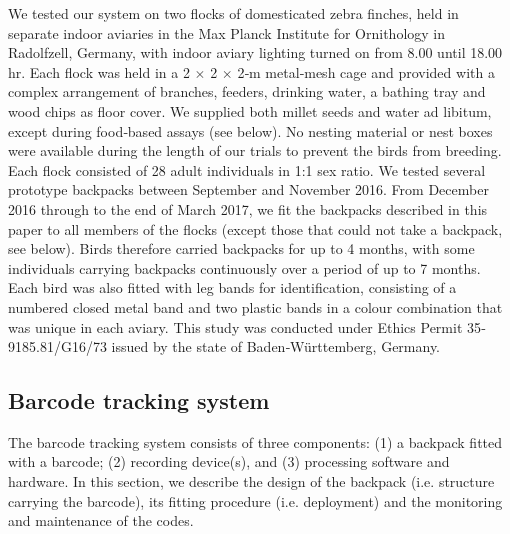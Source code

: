\documentclass[11pt,a4paper,oneside]{book}
\begin{document}
\begin{doublespace}
We tested our system on two flocks of domesticated zebra finches, held in separate indoor aviaries in the Max Planck Institute for Ornithology in Radolfzell, Germany, with indoor aviary lighting turned on from 8.00 until 18.00 hr. Each flock was held in a 2 $\times$ 2 $\times$ 2‐m metal‐mesh cage and provided with a complex arrangement of branches, feeders, drinking water, a bathing tray and wood chips as floor cover. We supplied both millet seeds and water ad libitum, except during food‐based assays (see below). No nesting material or nest boxes were available during the length of our trials to prevent the birds from breeding. Each flock consisted of 28 adult individuals in 1:1 sex ratio. We tested several prototype backpacks between September and November 2016. From December 2016 through to the end of March 2017, we fit the backpacks described in this paper to all members of the flocks (except those that could not take a backpack, see below). Birds therefore carried backpacks for up to 4 months, with some individuals carrying backpacks continuously over a period of up to 7 months. Each bird was also fitted with leg bands for identification, consisting of a numbered closed metal band and two plastic bands in a colour combination that was unique in each aviary. This study was conducted under Ethics Permit 35‐9185.81/G16/73 issued by the state of Baden‐Württemberg, Germany.

\subsection{Barcode tracking system}
The barcode tracking system consists of three components: (1) a backpack fitted with a barcode; (2) recording device(s), and (3) processing software and hardware. In this section, we describe the design of the backpack (i.e. structure carrying the barcode), its fitting procedure (i.e. deployment) and the monitoring and maintenance of the codes.


\end{doublespace}
\end{document}
